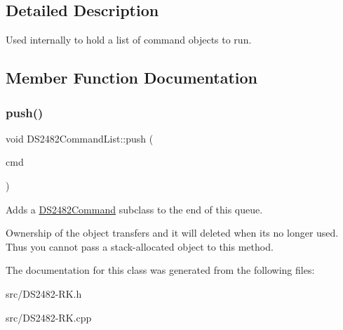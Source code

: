 \subsection{Detailed Description}
Used internally to hold a list of command objects to run. 

\subsection{Member Function Documentation}
\mbox{\label{class_d_s2482_command_list_a3586ea3275823c3e5f1463034ac1f7d5}} 
\subsubsection{\texorpdfstring{push()}{push()}}
{\footnotesize\ttfamily void D\+S2482\+Command\+List\+::push (\begin{DoxyParamCaption}\item[{\mbox{\hyperlink{class_d_s2482_command}{D\+S2482\+Command}} $\ast$}]{cmd }\end{DoxyParamCaption})}



Adds a \mbox{\hyperlink{class_d_s2482_command}{D\+S2482\+Command}} subclass to the end of this queue. 

Ownership of the object transfers and it will deleted when it\textquotesingle{}s no longer used. Thus you cannot pass a stack-\/allocated object to this method. 

The documentation for this class was generated from the following files\+:\begin{DoxyCompactItemize}
\item 
src/D\+S2482-\/\+R\+K.\+h\item 
src/D\+S2482-\/\+R\+K.\+cpp\end{DoxyCompactItemize}
